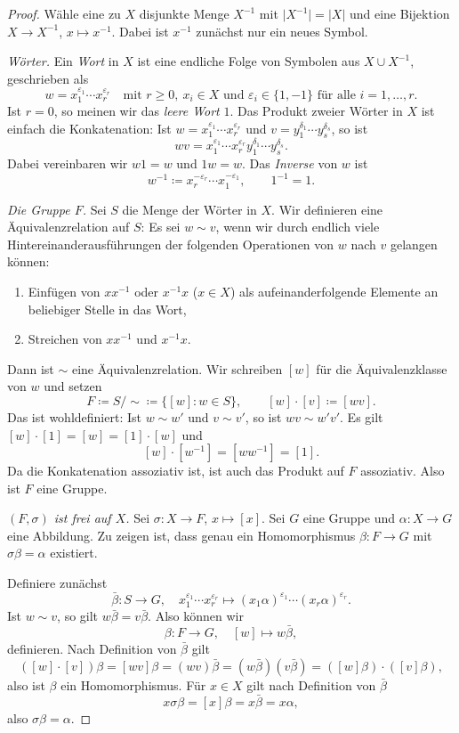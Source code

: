 \documentclass[11pt]{article}
\begin{document}
\begin{proof}
  Wähle eine zu $X$ disjunkte Menge $X^{-1}$ mit $\lvert X^{-1} \rvert = \lvert X \rvert$ und eine Bijektion $X \to X^{-1}$, $x \mapsto x^{-1}$. Dabei ist $x^{-1}$ zunächst nur ein neues Symbol.

  \textit{Wörter.} Ein \emph{Wort} in $X$ ist eine endliche Folge von Symbolen aus $X \cup X^{-1}$, geschrieben als
  \[ w = x_1^{\varepsilon_1} \cdots x_r^{\varepsilon_r} \quad \text{mit } r \ge 0,\ x_i \in X \text{ und } \varepsilon_i \in \{1, -1\} \text{ für alle } i = 1, \dots, r. \]
  Ist $r = 0$, so meinen wir das \emph{leere Wort} $1$.
Das Produkt zweier Wörter in $X$ ist einfach die Konkatenation: Ist $w = x_1^{\varepsilon_1} \cdots x_r^{\varepsilon_r}$ und $v = y_1^{\delta_1} \cdots y_s^{\delta_s}$, so ist
  \[ wv = x_1^{\varepsilon_1} \cdots x_r^{\varepsilon_r} y_1^{\delta_1} \cdots y_s^{\delta_s}. \]
  Dabei vereinbaren wir $w1 = w$ und $1w = w$. Das \emph{Inverse} von $w$ ist
  \[ w^{-1} \coloneqq x_r^{-\varepsilon_r} \cdots x_1^{-\varepsilon_1}, \qquad 1^{-1} = 1. \]

  \textit{Die Gruppe $F$.} Sei $S$ die Menge der Wörter in $X$. Wir definieren eine Äquivalenzrelation auf $S$: Es sei $w \sim v$, wenn wir durch endlich viele Hintereinanderausführungen der folgenden Operationen von $w$ nach $v$ gelangen können:
  \begin{enumerate}[label=(\alph*)]
    \item Einfügen von $xx^{-1}$ oder $x^{-1}x$ ($x \in X$) als aufeinanderfolgende Elemente an beliebiger Stelle in das Wort,
    \item Streichen von $xx^{-1}$ und $x^{-1}x$.
  \end{enumerate}
  Dann ist $\sim$ eine Äquivalenzrelation. Wir schreiben $[w]$ für die Äquivalenzklasse von $w$ und setzen
  \[ F \coloneqq S/{\sim} \coloneqq \{ [w] : w \in S \}, \qquad [w] \cdot [v] \coloneqq [wv]. \]
  Das ist wohldefiniert: Ist $w \sim w'$ und $v \sim v'$, so ist $wv \sim w'v'$. Es gilt $[w] \cdot [1] = [w] = [1] \cdot [w]$ und
  \[ [w] \cdot [w^{-1}] = [ww^{-1}] = [1]. \]
  Da die Konkatenation assoziativ ist, ist auch das Produkt auf $F$ assoziativ. Also ist $F$ eine Gruppe.

  \textit{$(F, \sigma)$ ist frei auf $X$.} Sei $\sigma\colon X \to F$, $x \mapsto [x]$. Sei $G$ eine Gruppe und $\alpha\colon X \to G$ eine Abbildung. Zu zeigen ist, dass genau ein Homomorphismus $\beta\colon F \to G$ mit $\sigma\beta = \alpha$ existiert.

  Definiere zunächst
  \[ \bar\beta\colon S \to G, \quad x_1^{\varepsilon_1} \cdots x_r^{\varepsilon_r} \mapsto (x_1\alpha)^{\varepsilon_1} \cdots (x_r\alpha)^{\varepsilon_r}. \]
  Ist $w \sim v$, so gilt $w\bar\beta = v\bar\beta$. Also können wir
  \[ \beta\colon F \to G, \quad [w] \mapsto w\bar\beta, \]
  definieren. Nach Definition von $\bar\beta$ gilt
  \[ ([w] \cdot [v])\beta = [wv]\beta = (wv)\bar\beta = (w\bar\beta)(v\bar\beta) = ([w]\beta) \cdot ([v]\beta), \]
  also ist $\beta$ ein Homomorphismus. Für $x \in X$ gilt nach Definition von $\bar\beta$
  \[ x\sigma\beta = [x]\beta = x\bar\beta = x\alpha, \]
  also $\sigma\beta = \alpha$.


\end{proof}
\end{document}
